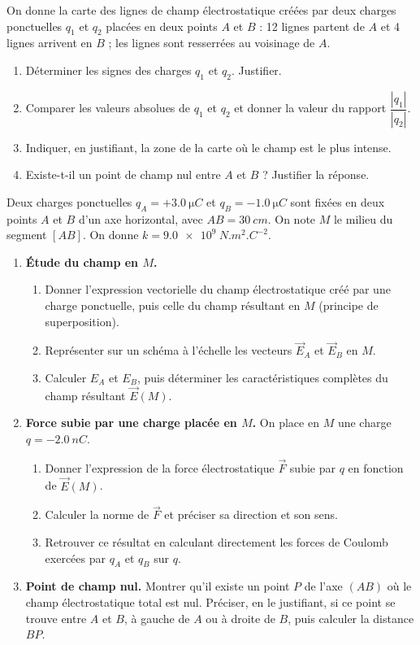 \documentclass[11pt]{article}
\newcounter{popsec}
\newcounter{popsub}
\newcommand{\courssub}[1]{%
  \stepcounter{popsub}%
  \par\vspace{9pt}\noindent{\popxbold\fontsize{11.5}{13}\selectfont\color{popink}{\color{poporange}\thepopsec.\thepopsub}\hspace{6pt}#1}\par\nopagebreak\vspace{4pt}
}
\begin{document}
\begin{exercice}
On donne la carte des lignes de champ électrostatique créées par deux charges ponctuelles $q_1$ et $q_2$ placées en deux points $A$ et $B$ : 12 lignes partent de $A$ et 4 lignes arrivent en $B$ ; les lignes sont resserrées au voisinage de $A$.
\begin{enumerate}
\item Déterminer les signes des charges $q_1$ et $q_2$. Justifier.
\item Comparer les valeurs absolues de $q_1$ et $q_2$ et donner la valeur du rapport $\dfrac{|q_1|}{|q_2|}$.
\item Indiquer, en justifiant, la zone de la carte où le champ est le plus intense.
\item Existe-t-il un point de champ nul entre $A$ et $B$ ? Justifier la réponse.
\end{enumerate}
\end{exercice}

\courssub{Je me prépare au Bac}

\begin{exercice}
Deux charges ponctuelles $q_A = +\SI{3,0}{\micro C}$ et $q_B = -\SI{1,0}{\micro C}$ sont fixées en deux points $A$ et $B$ d'un axe horizontal, avec $AB = \SI{30}{cm}$. On note $M$ le milieu du segment $[AB]$. On donne $k = \SI{9,0e9}{N.m^2.C^{-2}}$.
\begin{enumerate}
\item \textbf{Étude du champ en $M$.}
\begin{enumerate}
\item Donner l'expression vectorielle du champ électrostatique créé par une charge ponctuelle, puis celle du champ résultant en $M$ (principe de superposition).
\item Représenter sur un schéma à l'échelle les vecteurs $\vec{E}_A$ et $\vec{E}_B$ en $M$.
\item Calculer $E_A$ et $E_B$, puis déterminer les caractéristiques complètes du champ résultant $\vec{E}(M)$.
\end{enumerate}
\item \textbf{Force subie par une charge placée en $M$.} On place en $M$ une charge $q = -\SI{2,0}{nC}$.
\begin{enumerate}
\item Donner l'expression de la force électrostatique $\vec{F}$ subie par $q$ en fonction de $\vec{E}(M)$.
\item Calculer la norme de $\vec{F}$ et préciser sa direction et son sens.
\item Retrouver ce résultat en calculant directement les forces de Coulomb exercées par $q_A$ et $q_B$ sur $q$.
\end{enumerate}
\item \textbf{Point de champ nul.} Montrer qu'il existe un point $P$ de l'axe $(AB)$ où le champ électrostatique total est nul. Préciser, en le justifiant, si ce point se trouve entre $A$ et $B$, à gauche de $A$ ou à droite de $B$, puis calculer la distance $BP$.
\end{enumerate}
\end{exercice}
\end{document}
